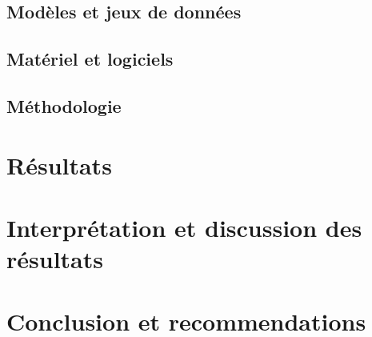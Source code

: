 \documentclass[12pt, letterpaper]{article}
\begin{document}
\subsection{Modèles et jeux de données}

\subsection{Matériel et logiciels}

\subsection{Méthodologie}


\section{Résultats}


\section{Interprétation et discussion des résultats}


\section{Conclusion et recommendations}


\clearpage 
\newpage
\printbibliography[title={\bibname\label{bib:references}}] 
\end{document}
